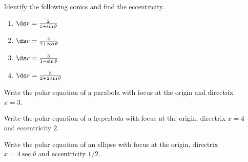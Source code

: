 \begin{enumialphparenastyle}

\begin{ex}
\noindent Identify the following conics and find the eccentricity.
\begin{multicols}{2}
\begin{enumerate}
	\item	$\ds r=\frac{2}{1+\sin\theta}$
	\item	$\ds r=\frac{4}{2+\cos\theta}$
	\item	$\ds r=\frac{3}{1-\sin\theta}$
	\item	$\ds r=\frac{5}{2+2\sin\theta}$
\end{enumerate}
\end{multicols}
\end{ex}


\begin{ex}
Write the polar equation of a parabola with focus at the origin and directrix $x=3$.
\end{ex}

\begin{ex}
Write the polar equation of a hyperbola with focus at the origin, directrix $x=4$ and eccentricity $2$.
\end{ex}

\begin{ex}
Write the polar equation of an ellipse with focus at the origin, directrix $x=4\sec\theta$ and eccentricity $1/2$.
\end{ex}

\end{enumialphparenastyle}